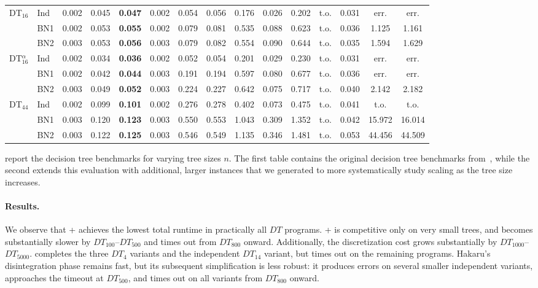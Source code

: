\begin{table}[!t]
{\begin{tabular}{llccccccccccccc}
    \midrule
    DT$_{16}$         & Ind  & 0.002 & 0.045 & \textbf{0.047} & 0.002 & 0.054 & 0.056 & 0.176 & 0.026 & 0.202 & t.o. & 0.031 & err. & err. \\
                      & BN1  & 0.002 & 0.053 & \textbf{0.055} & 0.002 & 0.079 & 0.081 & 0.535 & 0.088 & 0.623 & t.o. & 0.036 & 1.125 & 1.161 \\
                      & BN2  & 0.003 & 0.053 & \textbf{0.056} & 0.003 & 0.079 & 0.082 & 0.554 & 0.090 & 0.644 & t.o. & 0.035 & 1.594 & 1.629 \\
    \midrule
    DT$^{\alpha}_{16}$ & Ind & 0.002 & 0.034 & \textbf{0.036} & 0.002 & 0.052 & 0.054 & 0.201 & 0.029 & 0.230 & t.o. & 0.031 & err. & err. \\
                       & BN1 & 0.002 & 0.042 & \textbf{0.044} & 0.003 & 0.191 & 0.194 & 0.597 & 0.080 & 0.677 & t.o. & 0.036 & err. & err. \\
                       & BN2 & 0.003 & 0.049 & \textbf{0.052} & 0.003 & 0.224 & 0.227 & 0.642 & 0.075 & 0.717 & t.o. & 0.040 & 2.142 & 2.182 \\
    \midrule
    DT$_{44}$         & Ind  & 0.002 & 0.099 & \textbf{0.101} & 0.002 & 0.276 & 0.278 & 0.402 & 0.073 & 0.475 & t.o. & 0.041 & t.o. & t.o. \\
                      & BN1  & 0.003 & 0.120 & \textbf{0.123} & 0.003 & 0.550 & 0.553 & 1.043 & 0.309 & 1.352 & t.o. & 0.042 & 15.972 & 16.014 \\
                      & BN2  & 0.003 & 0.122 & \textbf{0.125} & 0.003 & 0.546 & 0.549 & 1.135 & 0.346 & 1.481 & t.o. & 0.053 & 44.456 & 44.509 \\
    \bottomrule
    \end{tabular}
    }
  \end{table}

 report the decision tree benchmarks for varying tree sizes $n$. The first table contains the original decision tree benchmarks from~\cite{albarghouthi2017fairsquare}, while the second extends this evaluation with additional, larger instances that we generated to more systematically study scaling as the tree size increases.

\paragraph{Results.} We observe that \Slice{}+\Dice{} achieves the lowest total runtime in practically all $DT$ programs. \Slice{}+\Roulette{} is competitive only on very small trees, and becomes substantially slower by $DT_{100}$--$DT_{500}$ and times out from $DT_{800}$ onward. Additionally, the discretization cost grows substantially by $DT_{1000}$--$DT_{5000}$. \PSI{} completes the three $DT_4$ variants and the independent $DT_{14}$ variant, but times out on the remaining programs. Hakaru's disintegration phase remains fast, but its subsequent simplification is less robust: it produces errors on several smaller independent variants, approaches the timeout at $DT_{500}$, and times out on all variants from $DT_{800}$ onward.

